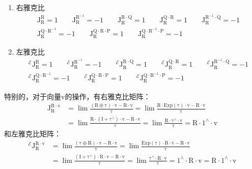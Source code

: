 \documentclass[12pt, onecolumn]{article}
\newcommand\liehat[1]{#1^{\land}}
\newcommand\Exp[1]{\mathrm{Exp}\left( #1\right) }
\newcommand\bsm[1]{\boldsymbol{\mathrm{#1}}}
\begin{document}
	\begin{enumerate}
	\item 右雅克比
	\begin{equation}
	\begin{gathered}
	\bsm{J}_{\bsm{R}}^{\bsm{R}}=1
	\qquad
	\bsm{J}_{\bsm{R}}^{\bsm{R}^{-1}}=-1
	\qquad
	\bsm{J}_{\bsm{R}}^{\bsm{R}\cdot\bsm{Q}}=1
	\qquad
	\bsm{J}_{\bsm{R}}^{\bsm{Q}\cdot\bsm{R}}=1
	\qquad
	\bsm{J}_{\bsm{R}}^{\bsm{R}^{-1}\cdot\bsm{Q}}=-1
	\\
	\bsm{J}_{\bsm{R}}^{\bsm{Q}\cdot\bsm{R}^{-1}}=-1
	\qquad
	\bsm{J}_{\bsm{R}}^{\bsm{Q}\cdot\bsm{R}\cdot\bsm{P}}=1
	\qquad
	\bsm{J}_{\bsm{R}}^{\bsm{Q}\cdot\bsm{R}^{-1}\cdot\bsm{P}}=-1
	\end{gathered}
	\end{equation}

	\item 左雅克比
	\begin{equation}
	\begin{gathered}
	^\mathcal{E}\bsm{J}_{\bsm{R}}^{\bsm{R}}=1
	\qquad
	^\mathcal{E}\bsm{J}_{\bsm{R}}^{\bsm{R}^{-1}}=-1
	\qquad
	^\mathcal{E}\bsm{J}_{\bsm{R}}^{\bsm{R}\cdot\bsm{Q}}=1
	\qquad
	^\mathcal{E}\bsm{J}_{\bsm{R}}^{\bsm{Q}\cdot\bsm{R}}=1
	\qquad
	^\mathcal{E}\bsm{J}_{\bsm{R}}^{\bsm{R}^{-1}\cdot\bsm{Q}}=-1
	\\
	^\mathcal{E}\bsm{J}_{\bsm{R}}^{\bsm{Q}\cdot\bsm{R}^{-1}}=-1
	\qquad
	^\mathcal{E}\bsm{J}_{\bsm{R}}^{\bsm{Q}\cdot\bsm{R}\cdot\bsm{P}}=1
	\qquad
	^\mathcal{E}\bsm{J}_{\bsm{R}}^{\bsm{Q}\cdot\bsm{R}^{-1}\cdot\bsm{P}}=-1
	\end{gathered}
	\end{equation}
	\end{enumerate}
	特别的，对于向量$\bsm{v}$的操作，有右雅克比矩阵：
	\begin{equation}
	\begin{aligned}
	\bsm{J}_{\bsm{R}}^{\bsm{R}\cdot\bsm{v}}&=
	\lim\frac{\left( \bsm{R}\oplus\bsm{\tau}\right) \cdot\bsm{v}- \bsm{R}\cdot\bsm{v}}{\bsm{\tau}}=
	\lim\frac{\bsm{R}\cdot\Exp{\bsm{\tau}} \cdot\bsm{v}- \bsm{R}\cdot\bsm{v}}{\bsm{\tau}}
	\\
	&=\lim\frac{\bsm{R}\cdot\left( \bsm{I}+\liehat{\bsm{\tau}}\right)  \cdot\bsm{v}- \bsm{R}\cdot\bsm{v}}{\bsm{\tau}}
	=\lim\frac{\bsm{R}\cdot\liehat{\bsm{\tau}}  \cdot\bsm{v}}{\bsm{\tau}}
	=\bsm{R}\cdot\liehat{{1}}\cdot\bsm{v}
	\end{aligned}
	\end{equation}
	和左雅克比矩阵：
	\begin{equation}
	\begin{aligned}
	^\mathcal{E}\bsm{J}_{\bsm{R}}^{\bsm{R}\cdot\bsm{v}}&=
	\lim\frac{\left( \bsm{\tau}\oplus\bsm{R}\right) \cdot\bsm{v}- \bsm{R}\cdot\bsm{v}}{\bsm{\tau}}=
	\lim\frac{\Exp{\bsm{\tau}} \cdot\bsm{R}\cdot\bsm{v}- \bsm{R}\cdot\bsm{v}}{\bsm{\tau}}
	\\
	&=\lim\frac{\left( \bsm{I}+\liehat{\bsm{\tau}}\right)  \cdot\bsm{R}\cdot\bsm{v}- \bsm{R}\cdot\bsm{v}}{\bsm{\tau}}
	=\lim\frac{\liehat{\bsm{\tau}}  \cdot\bsm{R}\cdot\bsm{v}}{\bsm{\tau}}
	=\liehat{{1}}\cdot\bsm{R}\cdot\bsm{v}
	=\bsm{R}\cdot\liehat{{1}}\cdot\bsm{v}
	\end{aligned}
	\end{equation}
\end{document}
